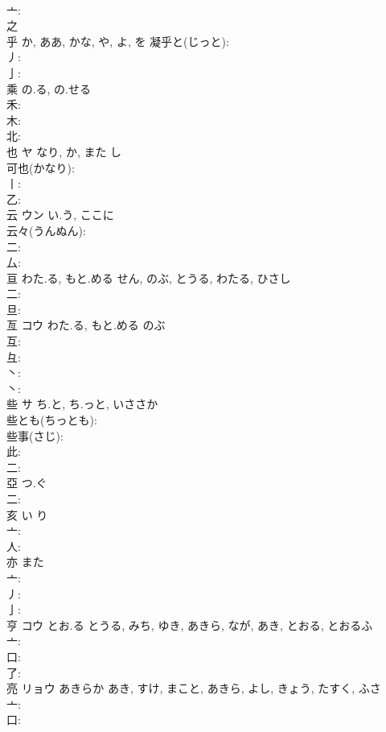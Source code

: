 \documentclass[8pt]{extreport}
\begin{document}
\begin{CJK}{UTF8}{min}
\\	亠: 
\\	之
\\	乎		か, ああ, かな, や, よ, を			凝乎と(じっと): 
\\	丿: 
\\	亅: 
\\	乘		の.る, の.せる				
\\	禾: 
\\	木: 
\\	北: 
\\	也	ヤ	なり, か, また	し	
\\	可也(かなり): 
\\	丨: 
\\	乙: 
\\	云	ウン	い.う, ここに		
\\	云々(うんぬん): 
\\	二: 
\\	厶: 
\\	亘		わた.る, もと.める	せん, のぶ, とうる, わたる, ひさし			
\\	二: 
\\	旦: 
\\	亙	コウ	わた.る, もと.める	のぶ	
\\	互: 
\\	彑: 
\\	丶: 
\\	丶: 
\\	些	サ	ち.と, ち.っと, いささか		
\\	些とも(ちっとも): 
\\	些事(さじ): 
\\	此: 
\\	二: 
\\	亞		つ.ぐ				
\\	二: 
\\	亥		い	り			
\\	亠: 
\\	人: 
\\	亦		また				
\\	亠: 
\\	丿: 
\\	亅: 
\\	亨	コウ	とお.る	とうる, みち, ゆき, あきら, なが, あき, とおる, とおるふ	
\\	亠: 
\\	口: 
\\	了: 
\\	亮	リョウ	あきらか	あき, すけ, まこと, あきら, よし, きょう, たすく, ふさ	
\\	亠: 
\\	口: 

\end{CJK}
\end{document}
